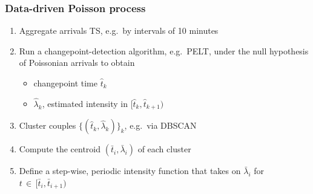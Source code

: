 \documentclass[table,aspectratio=169]{beamer}
\begin{document}
\begin{frame}[t]\frametitle{Data-driven Poisson process}
    \begin{enumerate}
        \item Aggregate arrivals TS, e.g.\ by intervals of 10 minutes
        \item Run a \alert{changepoint-detection} algorithm, e.g.\ PELT, under the null hypothesis of Poissonian arrivals to obtain
        \begin{itemize}
            \item changepoint time $\hat{t}_k$
            \item $\hat{\lambda}_k$, estimated intensity in $[\hat{t}_k, \hat{t}_{k+1})$
        \end{itemize}
        \item \alert{Cluster} couples $\{(\hat{t}_k, \hat{\lambda}_k)\}_k$, e.g.\ via DBSCAN
        \item Compute the \alert{centroid} $(\bar{t}_i, \bar{\lambda}_i)$ of each cluster
        \item Define a \alert{step-wise, periodic intensity function} that takes on $\bar{\lambda}_i$ for $t \,\in\, [\bar{t}_i, \bar{t}_{i+1})$
    \end{enumerate}
\end{frame}
\end{document}
